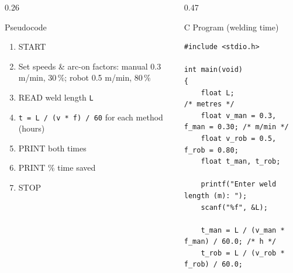 \documentclass[aspectratio=169]{beamer}
\begin{document}
	\begin{frame}{}

		\vspace*{0.05cm}

		\begin{columns}[T,onlytextwidth]


			\begin{column}{0.26\textwidth}

				\begin{block}{Pseudocode}
					\scriptsize
					\begin{enumerate}
						\item START
						\item Set speeds \& arc-on factors: manual 0.3 m/min, 30\,\%; robot 0.5 m/min, 80\,\%
						\item READ weld length \texttt{L}
						\item \texttt{t = L / (v * f) / 60} for each method (hours)
						\item PRINT both times
						\item PRINT \% time saved
						\item STOP
					\end{enumerate}
				\end{block}

			\end{column}


			\hspace*{0.3cm}
			\begin{column}{0.47\textwidth}

				\begin{block}{C Program (welding time)}

\begin{lstlisting}[style=cstyle,numbers=none,basicstyle=\ttfamily\scriptsize]
#include <stdio.h>

int main(void)
{
	float L;                        /* metres */
	float v_man = 0.3, f_man = 0.30; /* m/min */
	float v_rob = 0.5, f_rob = 0.80;
	float t_man, t_rob;

	printf("Enter weld length (m): ");
	scanf("%f", &L);

	t_man = L / (v_man * f_man) / 60.0; /* h */
	t_rob = L / (v_rob * f_rob) / 60.0;


\end{lstlisting}
\end{block}
\end{column}
\end{columns}
\end{frame}
\end{document}
